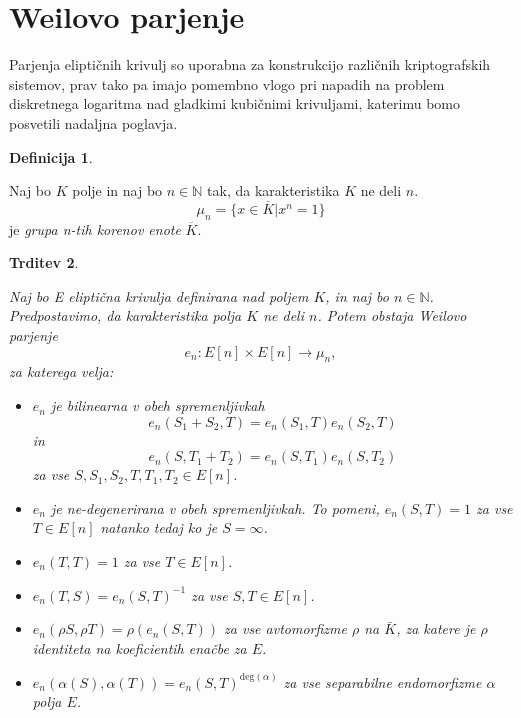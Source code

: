 \documentclass[12pt,a4paper,twoside]{article}
\theoremstyle{definition} %
\newtheorem{definicija}{Definicija}[section]
\theoremstyle{plain} %
\newtheorem{trditev}[definicija]{Trditev}
\numberwithin{equation}{section}  %
\newcommand{\N}{\mathbb N}
\begin{document}
\newpage
\section{Weilovo parjenje}
Parjenja eliptičnih krivulj \cite{Washington2008} so uporabna za konstrukcijo različnih kriptografskih sistemov, prav tako pa imajo pomembno vlogo pri napadih na problem diskretnega logaritma nad
gladkimi kubičnimi krivuljami, katerimu bomo posvetili nadaljna poglavja.

\begin{definicija}~

Naj bo $K$ polje in naj bo $n \in \N$ tak, da karakteristika $K$ ne deli $n$.
$$\mu_n = \{ x \in \overline{K} | x^n = 1 \}$$
je \emph{grupa n-tih korenov enote} $\overline{K}$.
\end{definicija}

\begin{trditev}~

\label{trd-WeilPar}
Naj bo E eliptična krivulja definirana nad poljem $K$, in naj bo $n \in \N$. Predpostavimo, da karakteristika polja $K$ ne deli $n$. Potem obstaja Weilovo parjenje
$$e_n:E[n] \times E[n] \rightarrow \mu_n,$$
za katerega velja:
\begin{itemize}
\item $e_n$ je bilinearna v obeh spremenljivkah
$$e_n(S_1+S_2,T) = e_n(S_1,T)e_n(S_2,T)$$
in
$$e_n(S,T_1+T_2) = e_n(S,T_1)e_n(S,T_2)$$
za vse $S,S_1,S_2,T,T_1,T_2 \in E[n]$.
\item $e_n$ je ne-degenerirana v obeh spremenljivkah. To pomeni, $e_n(S,T) = 1$ za vse $T \in E[n]$ natanko tedaj ko je $S = \infty$.

\item $e_n(T,T) = 1$ za vse $T \in E[n]$.

\item $e_n(T,S) = e_n(S,T)^{-1}$ za vse $S,T \in E[n]$.

\item $e_n(\rho S,\rho T) = \rho(e_n(S,T))$ za vse avtomorfizme $\rho$ na $\bar{K}$, za katere je $\rho$ identiteta na koeficientih enačbe za $E$.

\item $e_n(\alpha(S),\alpha(T)) = e_n(S,T)^{\text{deg}(\alpha)}$ za vse separabilne endomorfizme $\alpha$ polja $E$.
\end{itemize}

\end{trditev}
\end{document}
